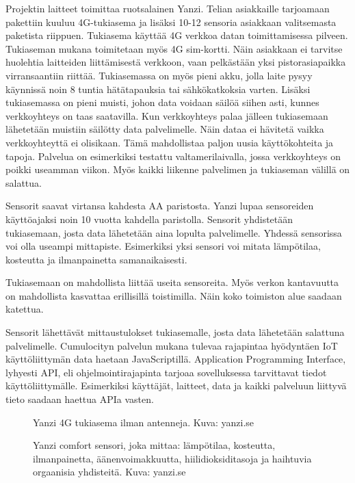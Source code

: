 \documentclass{tktltiki}
\begin{document}
Projektin laitteet toimittaa ruotsalainen Yanzi. Telian asiakkaille tarjoamaan pakettiin kuuluu 4G-tukiasema ja lisäksi 10-12 sensoria asiakkaan valitsemasta paketista riippuen. Tukiasema käyttää 4G verkkoa datan toimittamisessa pilveen. Tukiaseman mukana toimitetaan myös 4G sim-kortti. Näin asiakkaan ei tarvitse huolehtia laitteiden liittämisestä verkkoon, vaan pelkästään yksi pistorasiapaikka virransaantiin riittää. Tukiasemassa on myös pieni akku, jolla laite pysyy käynnissä noin 8 tuntia hätätapauksia tai sähkökatkoksia varten. Lisäksi tukiasemassa on pieni muisti, johon data voidaan säilöä siihen asti, kunnes verkkoyhteys on taas saatavilla. Kun verkkoyhteys palaa jälleen tukiasemaan lähetetään muistiin säilötty data palvelimelle. Näin dataa ei hävitetä vaikka verkkoyhteyttä ei olisikaan. Tämä mahdollistaa paljon uusia käyttökohteita ja tapoja. Palvelua on esimerkiksi testattu valtamerilaivalla, jossa verkkoyhteys on poikki useamman viikon. Myös kaikki liikenne palvelimen ja tukiaseman välillä on salattua.

Sensorit saavat virtansa kahdesta AA paristosta. Yanzi lupaa sensoreiden käyttöajaksi noin 10 vuotta kahdella paristolla. Sensorit yhdistetään tukiasemaan, josta data lähetetään aina lopulta palvelimelle. Yhdessä sensorissa voi olla useampi mittapiste. Esimerkiksi yksi sensori voi mitata lämpötilaa, kosteutta ja ilmanpainetta samanaikaisesti. 

Tukiasemaan on mahdollista liittää useita sensoreita. Myös verkon kantavuutta on mahdollista kasvattaa erillisillä toistimilla. Näin koko toimiston alue saadaan katettua. 

Sensorit lähettävät mittaustulokset tukiasemalle, josta data lähetetään salattuna palvelimelle. Cumulocityn palvelun mukana tulevaa rajapintaa hyödyntäen IoT käyttöliittymän data haetaan JavaScriptillä. Application Programming Interface, lyhyesti API, eli ohjelmointirajapinta tarjoaa sovelluksessa tarvittavat tiedot käyttöliittymälle. Esimerkiksi käyttäjät, laitteet, data ja kaikki palveluun liittyvä tieto saadaan haettua APIa vasten. 

\begin{figure}[h]
\begin{center}
\caption{Yanzi 4G tukiasema ilman antenneja. Kuva: yanzi.se}
\label{Yanzi tukiasema}
\end{center}
\end{figure}

\begin{figure}[h]
\begin{center}
\caption{Yanzi comfort sensori, joka mittaa: lämpötilaa, kosteutta, ilmanpainetta, äänenvoimakkuutta, hiilidioksiditasoja ja haihtuvia orgaanisia yhdisteitä. Kuva: yanzi.se}
\label{Yanzi sensori}
\end{center}
\end{figure}
\clearpage
\end{document}
